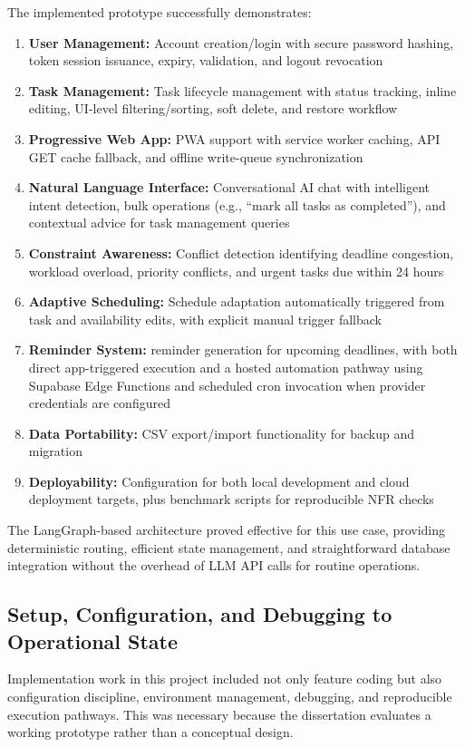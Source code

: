 \documentclass[12pt]{article}
\begin{document}
The implemented prototype successfully demonstrates:
\begin{enumerate}
    \item \textbf{User Management:} Account creation/login with secure password hashing, token session issuance, expiry, validation, and logout revocation
    \item \textbf{Task Management:} Task lifecycle management with status tracking, inline editing, UI-level filtering/sorting, soft delete, and restore workflow
    \item \textbf{Progressive Web App:} PWA support with service worker caching, API GET cache fallback, and offline write-queue synchronization
    \item \textbf{Natural Language Interface:} Conversational AI chat with intelligent intent detection, bulk operations (e.g., ``mark all tasks as completed''), and contextual advice for task management queries
    \item \textbf{Constraint Awareness:} Conflict detection identifying deadline congestion, workload overload, priority conflicts, and urgent tasks due within 24 hours
    \item \textbf{Adaptive Scheduling:} Schedule adaptation automatically triggered from task and availability edits, with explicit manual trigger fallback
    \item \textbf{Reminder System:} reminder generation for upcoming deadlines, with both direct app-triggered execution and a hosted automation pathway using Supabase Edge Functions and scheduled cron invocation when provider credentials are configured
    \item \textbf{Data Portability:} CSV export/import functionality for backup and migration
    \item \textbf{Deployability:} Configuration for both local development and cloud deployment targets, plus benchmark scripts for reproducible NFR checks
\end{enumerate}

The LangGraph-based architecture proved effective for this use case, providing deterministic routing, efficient state management, and straightforward database integration without the overhead of LLM API calls for routine operations.

\subsection{Setup, Configuration, and Debugging to Operational State}
Implementation work in this project included not only feature coding but also configuration discipline, environment management, debugging, and reproducible execution pathways. This was necessary because the dissertation evaluates a working prototype rather than a conceptual design.
\end{document}
